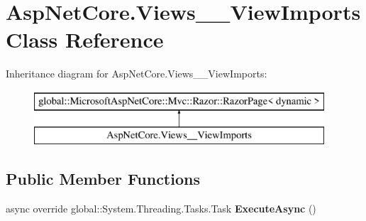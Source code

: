 \hypertarget{class_asp_net_core_1_1_views_____view_imports}{}\section{Asp\+Net\+Core.\+Views\+\_\+\+\_\+\+View\+Imports Class Reference}
\label{class_asp_net_core_1_1_views_____view_imports}
Inheritance diagram for Asp\+Net\+Core.\+Views\+\_\+\+\_\+\+View\+Imports\+:\begin{figure}[H]
\begin{center}
\leavevmode
\includegraphics[height=2.000000cm]{class_asp_net_core_1_1_views_____view_imports}
\end{center}
\end{figure}
\subsection*{Public Member Functions}
\begin{DoxyCompactItemize}
\item 
\mbox{\label{class_asp_net_core_1_1_views_____view_imports_afb0fbe4d2cff8ff940fd8555b3f3c64e}} 
async override global\+::\+System.\+Threading.\+Tasks.\+Task {\bfseries Execute\+Async} ()
\end{DoxyCompactItemize}
